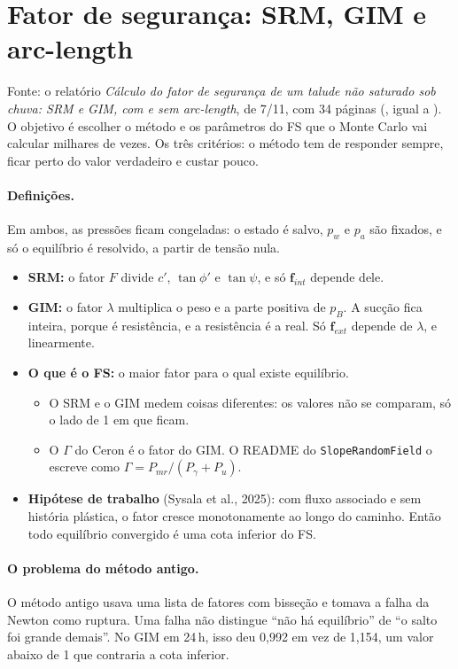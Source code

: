 \section{Fator de segurança: SRM, GIM e arc-length}
\label{sec:fs}

Fonte: o relatório \emph{Cálculo do fator de segurança de um talude não saturado sob chuva: SRM e GIM, com e sem
arc-length}, de 7/11, com 34 páginas (, igual a ). O
objetivo é escolher o método e os parâmetros do FS que o Monte Carlo vai calcular milhares de vezes. Os três
critérios: o método tem de responder sempre, ficar perto do valor verdadeiro e custar pouco.

\paragraph{Definições.} Em ambos, as pressões ficam congeladas: o estado é salvo, $p_w$ e $p_a$ são fixados, e só o
equilíbrio é resolvido, a partir de tensão nula.
\begin{itemize}
  \item \textbf{SRM:} o fator $F$ divide $c'$, $\tan\phi'$ e $\tan\psi$, e só $\bm f_{int}$ depende dele.
  \item \textbf{GIM:} o fator $\lambda$ multiplica o peso e a parte positiva de $p_B$. A sucção fica inteira, porque é
    resistência, e a resistência é a real. Só $\bm f_{ext}$ depende de $\lambda$, e linearmente.
  \item \textbf{O que é o FS:} o maior fator para o qual existe equilíbrio.
    \begin{itemize}
      \item O SRM e o GIM medem coisas diferentes: os valores não se comparam, só o lado de 1 em que ficam.
      \item O $\Gamma$ do Ceron é o fator do GIM. O README do \texttt{SlopeRandomField} o escreve como
        $\Gamma = P_{mr}/(P_\gamma + P_u)$.
    \end{itemize}
  \item \textbf{Hipótese de trabalho} (Sysala et al., 2025): com fluxo associado e sem história plástica, o fator cresce
    monotonamente ao longo do caminho. Então todo equilíbrio convergido é uma cota inferior do FS.
\end{itemize}

\paragraph{O problema do método antigo.} O método antigo usava uma lista de fatores com bisseção e tomava a falha da
Newton como ruptura. Uma falha não distingue ``não há equilíbrio'' de ``o salto foi grande demais''. No GIM em 24\,h,
isso deu 0,992 em vez de 1,154, um valor abaixo de 1 que contraria a cota inferior.

